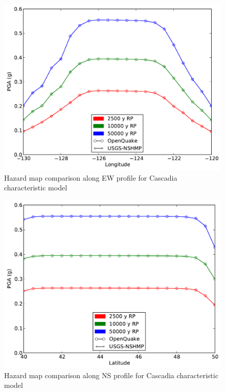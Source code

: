 \begin{figure}
\centering
\includegraphics[width=12.5cm]{./qareport/pictures/cascadia_char_oq_nshmp_ew.pdf}
\caption{Hazard map comparison along EW profile for Cascadia characteristic model}
\label{fig:cascadia_char_ew}
\end{figure}
\begin{figure}
\centering
\includegraphics[width=12.5cm]{./qareport/pictures/cascadia_char_oq_nshmp_ns.pdf}
\caption{Hazard map comparison along NS profile for Cascadia characteristic model}
\label{fig:cascadia_char_ns}
\end{figure}

